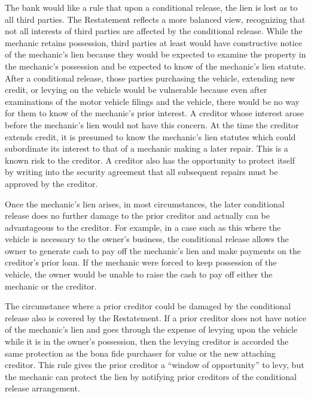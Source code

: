 The bank would like a rule that upon a conditional release, the lien is lost as
to all third parties. The Restatement reflects a more balanced view,
recognizing that not all interests of third parties are affected by the
conditional release. While the mechanic retains possession, third parties at
least would have constructive notice of the mechanic's lien because they would
be expected to examine the property in the mechanic's possession and be
expected to know of the mechanic's lien statute. After a conditional release,
those parties purchasing the vehicle, extending new credit, or levying on the
vehicle would be vulnerable because even after examinations of the motor
vehicle filings and the vehicle, there would be no way for them to know of the
mechanic's prior interest. A creditor whose interest arose before the
mechanic's lien would not have this concern. At the time the creditor extends
credit, it is presumed to know the mechanic's lien statutes which could
subordinate its interest to that of a mechanic making a later repair. This is a
known risk to the creditor. A creditor also has the opportunity to protect
itself by writing into the security agreement that all subsequent repairs must
be approved by the creditor.

Once the mechanic's lien arises, in most circumstances, the later conditional
release does no further damage to the prior creditor and actually can be
advantageous to the creditor. For example, in a case such as this where the
vehicle is necessary to the owner's business, the conditional release allows
the owner to generate cash to pay off the mechanic's lien and make payments on
the creditor's prior loan. If the mechanic were forced to keep possession of
the vehicle, the owner would be unable to raise the cash to pay off either the
mechanic or the creditor.

The circumstance where a prior creditor could be damaged by the conditional
release also is covered by the Restatement. If a prior creditor does not have
notice of the mechanic's lien and goes through the expense of levying upon the
vehicle while it is in the owner's possession, then the levying creditor is
accorded the same protection as the bona fide purchaser for value or the new
attaching creditor. This rule gives the prior creditor a ``window of
opportunity'' to levy, but the mechanic can protect the lien by notifying prior
creditors of the conditional release arrangement.

